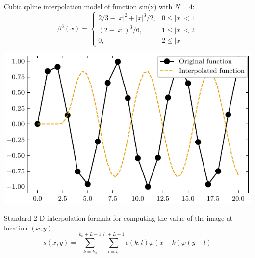 \documentclass[]{usiinfbachelorproject}
\begin{document}
	Cubic spline interpolation model of function sin(x) with $N=4$:
	\begin{equation}
		\beta^3(x) = 
		\begin{cases}
			2/3 - |x|^2 + |x|^3/2, & 0 \leq|x| < 1  \\
			(2-|x|)^3/6,           & 1 \leq |x| < 2 \\
			0,                     & 2 \leq |x|     
		\end{cases}
	\end{equation} \cite{main_article}
	
	\begin{center}
		\includegraphics{"images/cubic_interpolation_example.pdf"}
	\end{center}
	
	Standard 2-D interpolation formula for computing the value of the image at location $(x,y)$
	\begin{equation}
		s(x,y) = \sum_{k = k_0}^{k_0+L-1}\sum_{l=l_0}^{l_0+L-1} c(k,l)\varphi(x-k)\varphi(y-l)
	\end{equation}
	
	\fi
	
\end{document}
